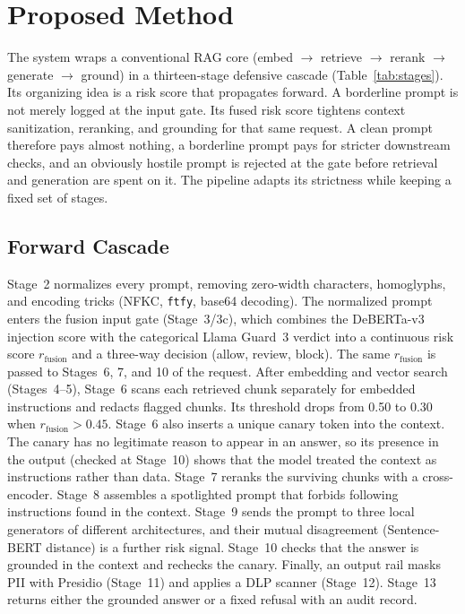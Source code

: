 \documentclass[conference]{IEEEtran}
\begin{document}
\section{Proposed Method}\label{sec:method}
The system wraps a conventional RAG core (embed $\rightarrow$ retrieve $\rightarrow$ rerank $\rightarrow$ generate $\rightarrow$ ground) in a thirteen-stage defensive cascade (Table~\ref{tab:stages}). Its organizing idea is a risk score that propagates forward. A borderline prompt is not merely logged at the input gate. Its fused risk score tightens context sanitization, reranking, and grounding for that same request. A clean prompt therefore pays almost nothing, a borderline prompt pays for stricter downstream checks, and an obviously hostile prompt is rejected at the gate before retrieval and generation are spent on it. The pipeline adapts its strictness while keeping a fixed set of stages.

\subsection{Forward Cascade}
Stage~2 normalizes every prompt, removing zero-width characters, homoglyphs, and encoding tricks (NFKC, \texttt{ftfy}, base64 decoding). The normalized prompt enters the fusion input gate (Stage~3/3c), which combines the DeBERTa-v3 injection score with the categorical Llama Guard~3 verdict into a continuous risk score $r_{\text{fusion}}$ and a three-way decision (allow, review, block). The same $r_{\text{fusion}}$ is passed to Stages~6, 7, and 10 of the request. After embedding and vector search (Stages~4--5), Stage~6 scans each retrieved chunk separately for embedded instructions and redacts flagged chunks. Its threshold drops from 0.50 to 0.30 when $r_{\text{fusion}}>0.45$. Stage~6 also inserts a unique canary token into the context. The canary has no legitimate reason to appear in an answer, so its presence in the output (checked at Stage~10) shows that the model treated the context as instructions rather than data. Stage~7 reranks the surviving chunks with a cross-encoder. Stage~8 assembles a spotlighted prompt that forbids following instructions found in the context. Stage~9 sends the prompt to three local generators of different architectures, and their mutual disagreement (Sentence-BERT distance) is a further risk signal. Stage~10 checks that the answer is grounded in the context and rechecks the canary. Finally, an output rail masks PII with Presidio (Stage~11) and applies a DLP scanner (Stage~12). Stage~13 returns either the grounded answer or a fixed refusal with an audit record.
\end{document}
